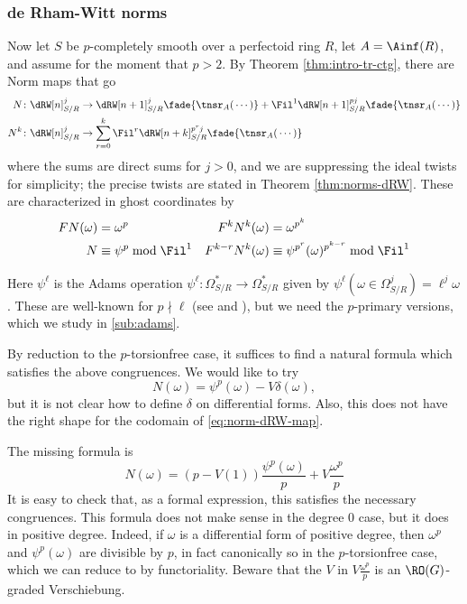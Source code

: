 \subsubsection{de Rham-Witt norms}
Now let $S$ be $p$-completely smooth over a perfectoid ring $R$, let $A=\Ainf(R)$, and assume for the moment that $p>2$. By Theorem \ref{thm:intro-tr-ctg}, there are Norm maps that go
\begin{align}
  \label{eq:norm-dRW-map}
  N\colon \dRW[n]^j_{S/R} &\to \dRW[n+1]^{j}_{S/R} \fade{{}\tnsr_A ({}\dotsb)} + \Fil^1 \dRW[n+1]^{pj}_{S/R} \fade{{}\tnsr_A ({}\dotsb)}\\
  N^k\colon \dRW[n]^j_{S/R} &\to \sum_{r=0}^k \Fil^r \dRW[n+k]^{p^rj}_{S/R} \fade{{}\tnsr_A ({}\dotsb)}
\end{align}
where the sums are direct sums for $j>0$, and we are suppressing the ideal twists for simplicity; the precise twists are stated in Theorem \ref{thm:norms-dRW}. These are characterized in ghost coordinates by
\begin{align*}
  FN(\omega) &= \omega^p & F^k N^k(\omega) &= \omega^{p^k}\\
  N &\equiv \psi^p \bmod \Fil^1 & F^{k-r} N^k(\omega) &\equiv \psi^{p^r}(\omega)^{p^{k-r}} \bmod \Fil^1
\end{align*}

Here $\psi^\ell$ is the Adams operation $\psi^\ell\colon \Omega^*_{S/R} \to \Omega^*_{S/R}$ given by $\psi^\ell(\omega\in\Omega^j_{S/R}) = \ell^j \omega$. These are well-known for $p\nmid \ell$ (see \cite[Proposition 9.14]{BMS2} and \cite[Proposition 6.4.12]{RaksitDDR}), but we need the $p$-primary versions, which we study in \sec\ref{sub:adams}.

By reduction to the $p$-torsionfree case, it suffices to find a natural formula which satisfies the above congruences. We would like to try
\[ N(\omega) = \psi^p(\omega) - V\delta(\omega), \]
but it is not clear how to define $\delta$ on differential forms. Also, this does not have the right shape for the codomain of \eqref{eq:norm-dRW-map}.

The missing formula is
\begin{equation}
  \label{eq:norm-formula-2}
  N(\omega) =  (p-V(1))\frac{\psi^p(\omega)}p + V\frac{\omega^p}p
\end{equation}
It is easy to check that, as a formal expression, this satisfies the necessary congruences. This formula does not make sense in the degree 0 case, but it does in positive degree. Indeed, if $\omega$ is a differential form of positive degree, then $\omega^p$ and $\psi^p(\omega)$ are divisible by $p$, in fact canonically so in the $p$-torsionfree case, which we can reduce to by functoriality. Beware that the $V$ in $V\frac{\omega^p}p$ is an $\RO(G)$-graded Verschiebung.

